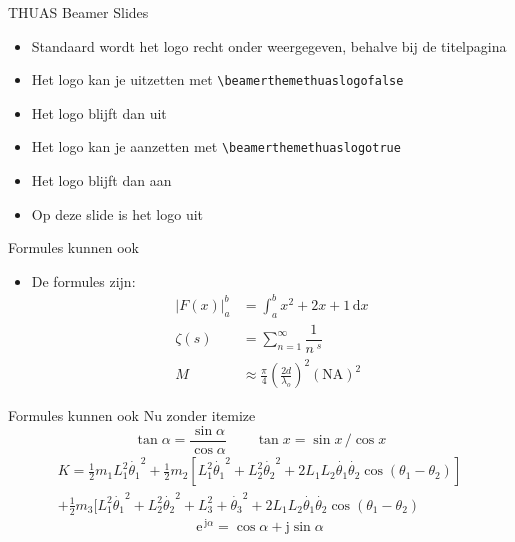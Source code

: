 \documentclass[fleqn,aspectratio=169,dutch]{beamer}
\begin{document}
\beamerthemethuaslogofalse

\begin{frame}[fragile]{THUAS Beamer Slides}
\begin{itemize}
\item Standaard wordt het logo recht onder weergegeven, behalve bij de titelpagina
\item Het logo kan je uitzetten met \lstinline|\beamerthemethuaslogofalse|
\item Het logo blijft dan uit
\item Het logo kan je aanzetten met \lstinline|\beamerthemethuaslogotrue|
\item Het logo blijft dan aan
\item Op deze slide is het logo uit
\end{itemize}
\end{frame}

\beamerthemethuaslogotrue

\begin{frame}{Formules kunnen ook}
\begin{itemize}
\item De formules zijn:
\begin{align*}
\left|F(x)\right|^b_a &= \int_a^b x^2 + 2x + 1 \, \mathrm{d} x \\
\zeta (s) &= \sum_{n=1}^\infty \dfrac{1}{n^{\;\!s}} \\
M&\approx\frac{\pi}{4}\left(\frac{2d}{\lambda_o}\right)^2\left(\mathrm{NA}\right)^2
\end{align*}
\end{itemize}
\end{frame}

\begin{frame}{Formules kunnen ook}
Nu zonder itemize
\begin{equation*}
\tan \alpha = \dfrac{\sin \alpha}{\cos \alpha} \qquad \tan x = \sin x \, / \cos x
\end{equation*}
\begin{multline*}  
K=\displaystyle{\frac{1}{2}m_1 L_1^2 \dot{\theta_1}^2+\frac{1}{2} m_2[L_1^2 \dot{\theta_1}^2+L_2^2 \dot{\theta_2}^2+2 L_1 L_2 \dot{\theta_1}\dot{\theta_2}\cos(\theta_1-\theta_2)]} \\
 \displaystyle{+\frac{1}{2}m_3[L_1^2 \dot{\theta_1}^2+L_2^2 \dot{\theta_2}^2+L_3^2+ \dot{\theta_3}^2+2 L_1 L_2 \dot{\theta_1}\dot{\theta_2}\cos(\theta_1-\theta_2)}
\end{multline*}
\begin{equation*}
\mathrm{e}^{\, \mathrm{j}\alpha} = \cos \alpha + \mathrm{j} \sin \alpha
\end{equation*}
\end{frame}
\end{document}
